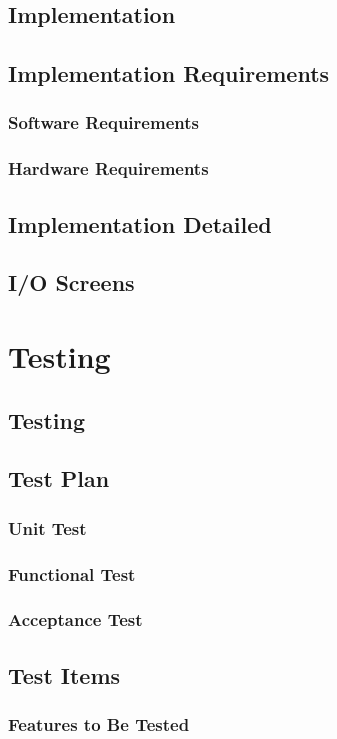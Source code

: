 \documentclass[a4paper, 12pt, oneside]{book}
\begin{document}
		\section{Implementation}
		\section{Implementation Requirements}
			\subsection{Software Requirements}
			\subsection{Hardware Requirements}
		\section{Implementation Detailed}
		\section{I/O Screens}
		\newpage	
	\chapter{Testing}
		\section{Testing}
		\section{Test Plan}
			\subsection{Unit Test}
			\subsection{Functional Test}
			\subsection{Acceptance Test}
		\section{Test Items}
			\subsection{Features to Be Tested}
\end{document}
